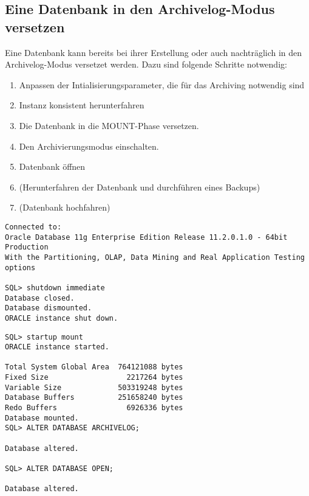       \subsection{Eine Datenbank in den Archivelog-Modus versetzen}
        Eine Datenbank kann bereits bei ihrer Erstellung oder auch nachtr\"aglich in den Archivelog-Modus versetzet werden. Dazu sind folgende Schritte notwendig:
        \begin{enumerate}
          \item Anpassen der Intialisierungsparameter, die f\"ur das Archiving notwendig sind
          \item Instanz konsistent herunterfahren
          \item Die Datenbank in die MOUNT-Phase versetzen.
          \item Den Archivierungsmodus einschalten.
          \item Datenbank \"offnen
          \item (Herunterfahren der Datenbank und durchf\"uhren eines Backups)
          \item (Datenbank hochfahren)
        \end{enumerate}
        \begin{lstlisting}[caption={Archivelog-Modus
        aktivieren},label=admin52,language=oracle_sql,alsolanguage=sqlplus] Connected to:
Oracle Database 11g Enterprise Edition Release 11.2.0.1.0 - 64bit Production
With the Partitioning, OLAP, Data Mining and Real Application Testing options

SQL> shutdown immediate
Database closed.
Database dismounted.
ORACLE instance shut down.
				\end{lstlisting}
\clearpage
\begin{lstlisting}[caption={Archivelog-Modus aktivieren -
Fortsetzung},label=admin52a,language=oracle_sql,alsolanguage=sqlplus]
SQL> startup mount 
ORACLE instance started.

Total System Global Area  764121088 bytes
Fixed Size                  2217264 bytes
Variable Size             503319248 bytes
Database Buffers          251658240 bytes
Redo Buffers                6926336 bytes
Database mounted.
SQL> ALTER DATABASE ARCHIVELOG;

Database altered.

SQL> ALTER DATABASE OPEN;

Database altered.
        \end{lstlisting}
